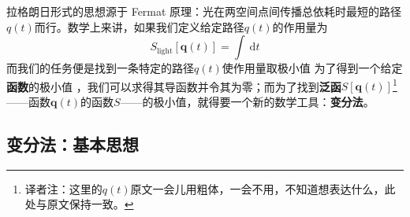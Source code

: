 拉格朗日形式的思想源于 Fermat 原理：光在两空间点间传播总依耗时最短的路径\(q(t)\)而行。数学上来讲，如果我们定义给定路径\(q(t)\)的作用量为
\[
S_{\text{light}}[{\mathbf q}(t)] = \int ~{\mathrm d}t
\]
而我们的任务便是找到一条特定的路径\(q(t)\)使作用量取极小值%
%
为了得到一个给定{\bf 函数}的极小值%
%
，我们可以求得其导函数并令其为零；而为了找到{\bf 泛函}\(S[{\mathbf q}(t)]\)\footnote{译者注：这里的$q(t)$原文一会儿用粗体，一会不用，不知道想表达什么，此处与原文保持一致。}——函数\({\mathbf q}(t)\)的函数\(S\)——的极小值，就得要一个新的数学工具：{\bf 变分法}。


\subsection{变分法：基本思想}\label{sec4.1.2}

